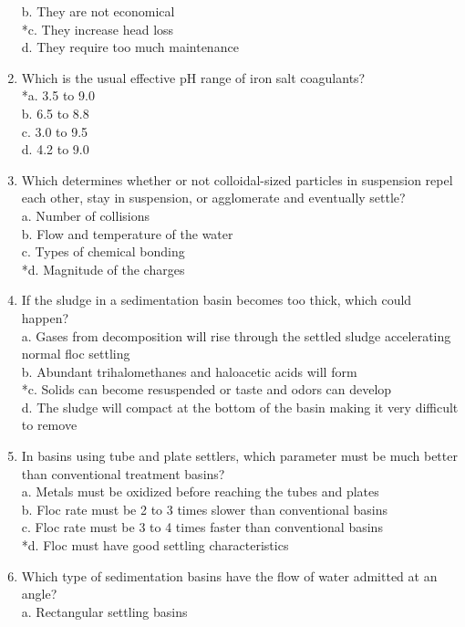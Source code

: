 \begin{enumerate}
b. They are not economical\\
*c. They increase head loss\\
d. They require too much maintenance\\
\item Which is the usual effective pH range of iron salt coagulants?\\
*a. 3.5 to 9.0\\
b. 6.5 to 8.8\\
c. 3.0 to 9.5\\
d. 4.2 to 9.0\\
\item Which determines whether or not colloidal-sized particles in suspension repel each other, stay in suspension, or agglomerate and eventually settle?\\
a. Number of collisions\\
b. Flow and temperature of the water\\
c. Types of chemical bonding\\
*d. Magnitude of the charges\\
\item If the sludge in a sedimentation basin becomes too thick, which could happen?\\
a. Gases from decomposition will rise through the settled sludge accelerating normal floc settling\\
b. Abundant trihalomethanes and haloacetic acids will form\\
*c. Solids can become resuspended or taste and odors can develop\\
d. The sludge will compact at the bottom of the basin making it very difficult to remove\\
\item In basins using tube and plate settlers, which parameter must be much better than conventional treatment basins?\\
a. Metals must be oxidized before reaching the tubes and plates\\
b. Floc rate must be 2 to 3 times slower than conventional basins\\
c. Floc rate must be 3 to 4 times faster than conventional basins\\
*d. Floc must have good settling characteristics \\
\item Which type of sedimentation basins have the flow of water admitted at an angle?\\
a. Rectangular settling basins\\

\end{enumerate}

